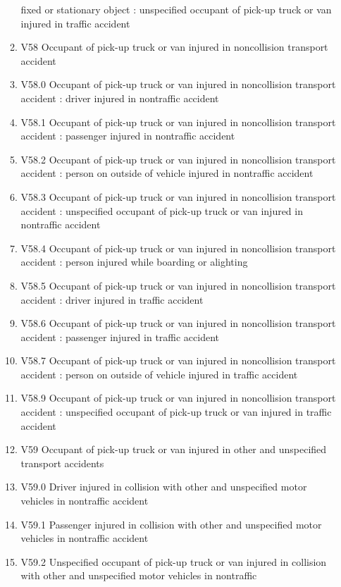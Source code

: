 \documentclass[
]{scrartcl}
\begin{document}
\begin{itemize}
\begin{enumerate}
    fixed or stationary object : unspecified occupant of pick-up truck
    or van injured in traffic accident
  \item
    V58 Occupant of pick-up truck or van injured in noncollision
    transport accident
  \item
    V58.0 Occupant of pick-up truck or van injured in noncollision
    transport accident : driver injured in nontraffic accident
  \item
    V58.1 Occupant of pick-up truck or van injured in noncollision
    transport accident : passenger injured in nontraffic accident
  \item
    V58.2 Occupant of pick-up truck or van injured in noncollision
    transport accident : person on outside of vehicle injured in
    nontraffic accident
  \item
    V58.3 Occupant of pick-up truck or van injured in noncollision
    transport accident : unspecified occupant of pick-up truck or van
    injured in nontraffic accident
  \item
    V58.4 Occupant of pick-up truck or van injured in noncollision
    transport accident : person injured while boarding or alighting
  \item
    V58.5 Occupant of pick-up truck or van injured in noncollision
    transport accident : driver injured in traffic accident
  \item
    V58.6 Occupant of pick-up truck or van injured in noncollision
    transport accident : passenger injured in traffic accident
  \item
    V58.7 Occupant of pick-up truck or van injured in noncollision
    transport accident : person on outside of vehicle injured in traffic
    accident
  \item
    V58.9 Occupant of pick-up truck or van injured in noncollision
    transport accident : unspecified occupant of pick-up truck or van
    injured in traffic accident
  \item
    V59 Occupant of pick-up truck or van injured in other and
    unspecified transport accidents
  \item
    V59.0 Driver injured in collision with other and unspecified motor
    vehicles in nontraffic accident
  \item
    V59.1 Passenger injured in collision with other and unspecified
    motor vehicles in nontraffic accident
  \item
    V59.2 Unspecified occupant of pick-up truck or van injured in
    collision with other and unspecified motor vehicles in nontraffic

\end{enumerate}
\end{itemize}
\end{document}

